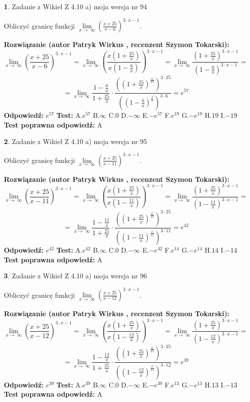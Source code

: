 \documentclass[12pt, a4paper]{article}
\theoremstyle{definition} %
\newtheorem{zad}{}
\newcommand{\zadStart}[1]{\begin{zad}#1\newline}
\newcommand{\zadStop}{\end{zad}}
\newcommand{\rozwStart}[2]{\noindent \textbf{Rozwiązanie (autor #1 , recenzent #2): }\newline}
\newcommand{\rozwStop}{\newline}
\newcommand{\odpStart}{\noindent \textbf{Odpowiedź:}\newline}
\newcommand{\odpStop}{\newline}
\newcommand{\testStart}{\noindent \textbf{Test:}\newline}
\newcommand{\testStop}{\newline}
\newcommand{\kluczStart}{\noindent \textbf{Test poprawna odpowiedź:}\newline}
\newcommand{\kluczStop}{\newline}
\begin{document}
\zadStart{Zadanie z Wikieł Z 4.10 a) moja wersja nr 94}

Obliczyć granicę funkcji  $\lim\limits_{x\to\ \infty}(\frac{x+25}{x-6})^{3\cdot x-1}$.
\zadStop
\rozwStart{Patryk Wirkus}{Szymon Tokarski}
$$\lim\limits_{x\to\ \infty}(\frac{x+25}{x-6})^{3\cdot x-1} = \lim\limits_{x\to\ \infty}(\frac{x(1+\frac{25}{x})}{x(1-\frac{6}{x})})^{3\cdot x-1}=\lim\limits_{x\to\ \infty}\frac{(1+\frac{25}{x})^{3\cdot x-1}}{(1-\frac{6}{x})^{3\cdot x-1}}=$$
$$=\lim\limits_{x\to\ \infty}\frac{1-\frac{6}{x}}{1+\frac{25}{x}}\cdot\frac{((1+\frac{25}{x})^{\frac{x}{25}})^{3\cdot25}}{((1-\frac{6}{x})^{\frac{x}{6}})^{3\cdot6}}=e^{57}$$
\rozwStop
\odpStart
$e^{57}$
\odpStop
\testStart
A.$e^{57}$ B.$\infty$ C.$0$ D.$-\infty$ E.$-e^{57}$
F.$e^{19}$ G.$-e^{19}$
H.$19$
I.$-19$
\testStop
\kluczStart
A
\kluczStop



\zadStart{Zadanie z Wikieł Z 4.10 a) moja wersja nr 95}

Obliczyć granicę funkcji  $\lim\limits_{x\to\ \infty}(\frac{x+25}{x-11})^{3\cdot x-1}$.
\zadStop
\rozwStart{Patryk Wirkus}{Szymon Tokarski}
$$\lim\limits_{x\to\ \infty}(\frac{x+25}{x-11})^{3\cdot x-1} = \lim\limits_{x\to\ \infty}(\frac{x(1+\frac{25}{x})}{x(1-\frac{11}{x})})^{3\cdot x-1}=\lim\limits_{x\to\ \infty}\frac{(1+\frac{25}{x})^{3\cdot x-1}}{(1-\frac{11}{x})^{3\cdot x-1}}=$$
$$=\lim\limits_{x\to\ \infty}\frac{1-\frac{11}{x}}{1+\frac{25}{x}}\cdot\frac{((1+\frac{25}{x})^{\frac{x}{25}})^{3\cdot25}}{((1-\frac{11}{x})^{\frac{x}{11}})^{3\cdot11}}=e^{42}$$
\rozwStop
\odpStart
$e^{42}$
\odpStop
\testStart
A.$e^{42}$ B.$\infty$ C.$0$ D.$-\infty$ E.$-e^{42}$
F.$e^{14}$ G.$-e^{14}$
H.$14$
I.$-14$
\testStop
\kluczStart
A
\kluczStop



\zadStart{Zadanie z Wikieł Z 4.10 a) moja wersja nr 96}

Obliczyć granicę funkcji  $\lim\limits_{x\to\ \infty}(\frac{x+25}{x-12})^{3\cdot x-1}$.
\zadStop
\rozwStart{Patryk Wirkus}{Szymon Tokarski}
$$\lim\limits_{x\to\ \infty}(\frac{x+25}{x-12})^{3\cdot x-1} = \lim\limits_{x\to\ \infty}(\frac{x(1+\frac{25}{x})}{x(1-\frac{12}{x})})^{3\cdot x-1}=\lim\limits_{x\to\ \infty}\frac{(1+\frac{25}{x})^{3\cdot x-1}}{(1-\frac{12}{x})^{3\cdot x-1}}=$$
$$=\lim\limits_{x\to\ \infty}\frac{1-\frac{12}{x}}{1+\frac{25}{x}}\cdot\frac{((1+\frac{25}{x})^{\frac{x}{25}})^{3\cdot25}}{((1-\frac{12}{x})^{\frac{x}{12}})^{3\cdot12}}=e^{39}$$
\rozwStop
\odpStart
$e^{39}$
\odpStop
\testStart
A.$e^{39}$ B.$\infty$ C.$0$ D.$-\infty$ E.$-e^{39}$
F.$e^{13}$ G.$-e^{13}$
H.$13$
I.$-13$
\testStop
\kluczStart
A
\kluczStop
\end{document}
